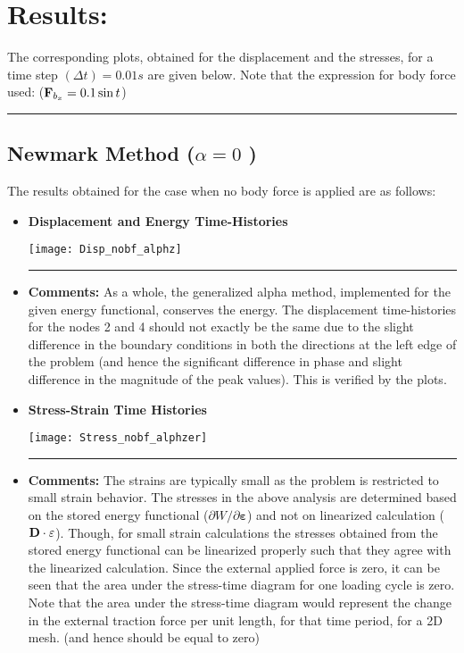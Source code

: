 \section*{Results: }
The corresponding plots, obtained for the displacement and the stresses, for a time step $(\Delta t) = 0.01s$ are given below. Note that the expression for body force used: (${\bf F}_{b_x} = 0.1\sin t$) \\ \hrule
\subsection*{Newmark Method ($\alpha = 0$ )}
The results obtained for the case when no body force is applied are as follows: 
\begin{itemize}
\item {\bf Displacement and Energy Time-Histories}
\begin{center}
\texttt{[image: Disp\_nobf\_alphz]}
\end{center}\hrule
\item { \bf Comments: } As a whole, the generalized alpha method, implemented for the given energy functional, conserves the energy. The displacement time-histories for the nodes 2 and 4 should not exactly be the same due to the slight difference in the boundary conditions in both the directions at the left edge of the problem (and hence the significant difference in phase and slight difference in the magnitude of the peak values). This is verified by the plots. 
\newpage 
\item {\bf Stress-Strain Time Histories}
\begin{center}
\texttt{[image: Stress\_nobf\_alphzer]}
\end{center}\hrule
\item { \bf Comments: } The strains are typically small as the problem is restricted to small strain behavior. The stresses in the above analysis are determined based on the stored energy functional ($\partial W/\partial{\bm\varepsilon}$) and not on linearized calculation ($\bf D\cdot\varepsilon$). Though, for small strain calculations the stresses obtained from the stored energy functional can be linearized properly such that they agree with the linearized calculation. Since the external applied force is zero, it can be seen that the area under the stress-time diagram for one loading cycle is zero. Note that the area under the stress-time diagram would represent the change in the external traction force per unit length, for that time period, for a 2D mesh. (and hence should be equal to zero)    
\end{itemize}
